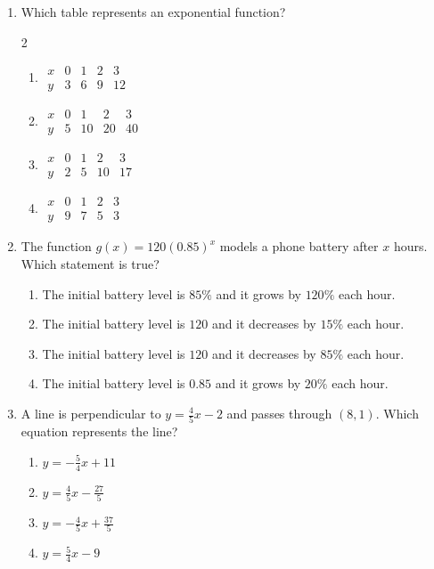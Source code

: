 \documentclass[11pt]{article}
\begin{document}
\begin{enumerate}
\newpage
\begin{partBox}
{\large \textcolor{nppurple2}{\textbf{Part B --- Math I Mastery}}}
\end{partBox}
\item Which table represents an exponential function?
\begin{multicols}{2}
\begin{enumerate}[label=(\Alph*)]
\item $\begin{array}{c|cccc}x&0&1&2&3\\ \hline y&3&6&9&12\end{array}$
\item $\begin{array}{c|cccc}x&0&1&2&3\\ \hline y&5&10&20&40\end{array}$
\item $\begin{array}{c|cccc}x&0&1&2&3\\ \hline y&2&5&10&17\end{array}$
\item $\begin{array}{c|cccc}x&0&1&2&3\\ \hline y&9&7&5&3\end{array}$
\end{enumerate}
\end{multicols}

\item The function $g(x)=120(0.85)^x$ models a phone battery after $x$ hours. Which statement is true?
\begin{enumerate}[label=(\Alph*)]
\item The initial battery level is $85\%$ and it grows by $120\%$ each hour.
\item The initial battery level is $120$ and it decreases by $15\%$ each hour.
\item The initial battery level is $120$ and it decreases by $85\%$ each hour.
\item The initial battery level is $0.85$ and it grows by $20\%$ each hour.
\end{enumerate}

\item A line is perpendicular to $y=\frac{4}{5}x-2$ and passes through $(8,1)$. Which equation represents the line?
\begin{enumerate}[label=(\Alph*)]
\item $y=-\frac{5}{4}x+11$ \item $y=\frac{4}{5}x-\frac{27}{5}$
\item $y=-\frac{4}{5}x+\frac{37}{5}$ \item $y=\frac{5}{4}x-9$
\end{enumerate}


\end{enumerate}
\end{document}
